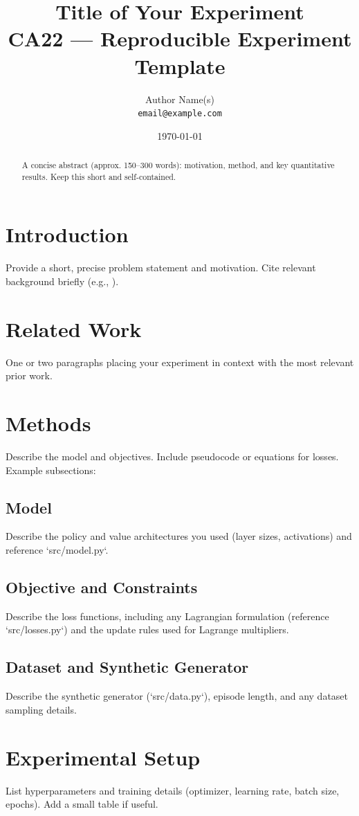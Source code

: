 \documentclass[11pt]{article}
\title{\textbf{Title of Your Experiment}\vspace{0.5em}\\\large CA22 — Reproducible Experiment Template}
\author{Author Name(s) \\\texttt{email@example.com}}
\date{\today}
\begin{document}
\maketitle

\begin{abstract}
A concise abstract (approx. 150–300 words): motivation, method, and key quantitative results. Keep this short and self-contained.
\end{abstract}

\section{Introduction}
Provide a short, precise problem statement and motivation. Cite relevant background briefly (e.g., \citep{Sutton2018}).

\section{Related Work}
One or two paragraphs placing your experiment in context with the most relevant prior work.

\section{Methods}
Describe the model and objectives. Include pseudocode or equations for losses. Example subsections:
\subsection{Model}
Describe the policy and value architectures you used (layer sizes, activations) and reference `src/model.py`.

\subsection{Objective and Constraints}
Describe the loss functions, including any Lagrangian formulation (reference `src/losses.py`) and the update rules used for Lagrange multipliers.

\subsection{Dataset and Synthetic Generator}
Describe the synthetic generator (`src/data.py`), episode length, and any dataset sampling details.

\section{Experimental Setup}
List hyperparameters and training details (optimizer, learning rate, batch size, epochs). Add a small table if useful.
\end{document}

